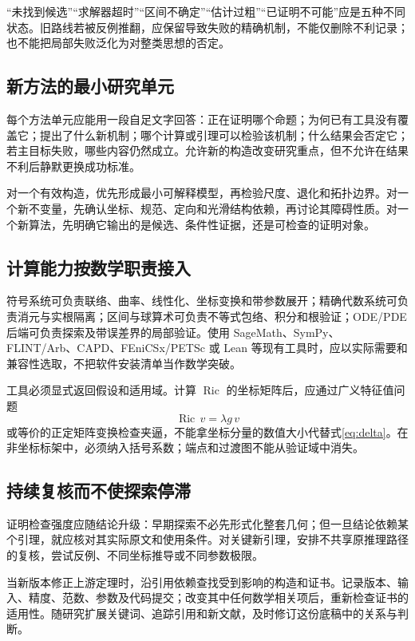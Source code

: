 \documentclass[11pt,a4paper]{article}
\theoremstyle{definition}
\newcommand{\Ric}{\operatorname{Ric}}
\begin{document}
“未找到候选”“求解器超时”“区间不确定”“估计过粗”“已证明不可能”应是五种不同状态。旧路线若被反例推翻，应保留导致失败的精确机制，不能仅删除不利记录；也不能把局部失败泛化为对整类思想的否定。

\subsection{新方法的最小研究单元}

每个方法单元应能用一段自足文字回答：正在证明哪个命题；为何已有工具没有覆盖它；提出了什么新机制；哪个计算或引理可以检验该机制；什么结果会否定它；若主目标失败，哪些内容仍然成立。允许新的构造改变研究重点，但不允许在结果不利后静默更换成功标准。

对一个有效构造，优先形成最小可解释模型，再检验尺度、退化和拓扑边界。对一个新不变量，先确认坐标、规范、定向和光滑结构依赖，再讨论其障碍性质。对一个新算法，先明确它输出的是候选、条件性证据，还是可检查的证明对象。

\subsection{计算能力按数学职责接入}

符号系统可负责联络、曲率、线性化、坐标变换和带参数展开；精确代数系统可负责消元与实根隔离；区间与球算术可负责不等式包络、积分和根验证；ODE/PDE 后端可负责探索及带误差界的局部验证。使用 SageMath、SymPy、FLINT/Arb、CAPD、FEniCSx/PETSc 或 Lean 等现有工具时，应以实际需要和兼容性选取，不把软件安装清单当作数学突破。

工具必须显式返回假设和适用域。计算 $\Ric$ 的坐标矩阵后，应通过广义特征值问题
\[
\Ric\,v=\lambda g\,v
\]
或等价的正定矩阵变换检查夹逼，不能拿坐标分量的数值大小代替式\eqref{eq:delta}。在非坐标标架中，必须纳入括号系数；端点和过渡图不能从验证域中消失。

\subsection{持续复核而不使探索停滞}

证明检查强度应随结论升级：早期探索不必先形式化整套几何；但一旦结论依赖某个引理，就应核对其实际原文和使用条件。对关键新引理，安排不共享原推理路径的复核，尝试反例、不同坐标推导或不同参数极限。

当新版本修正上游定理时，沿引用依赖查找受到影响的构造和证书。记录版本、输入、精度、范数、参数及代码提交；改变其中任何数学相关项后，重新检查证书的适用性。随研究扩展关键词、追踪引用和新文献，及时修订这份底稿中的关系与判断。
\end{document}
